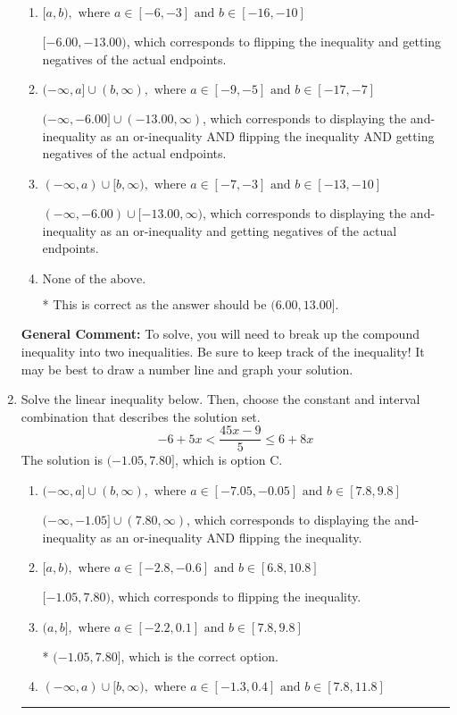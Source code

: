 \documentclass{extbook}[14pt]
\newcommand{\litem}[1]{\item #1

\rule{\textwidth}{0.4pt}}
\begin{document}
\begin{enumerate}
{\begin{enumerate}[label=\Alph*.]
$(-6.00, -13.00]$, which is the correct interval but negatives of the actual endpoints.
\item \( [a, b), \text{ where } a \in [-6, -3] \text{ and } b \in [-16, -10] \)

$[-6.00, -13.00)$, which corresponds to flipping the inequality and getting negatives of the actual endpoints.
\item \( (-\infty, a] \cup (b, \infty), \text{ where } a \in [-9, -5] \text{ and } b \in [-17, -7] \)

$(-\infty, -6.00] \cup (-13.00, \infty)$, which corresponds to displaying the and-inequality as an or-inequality AND flipping the inequality AND getting negatives of the actual endpoints.
\item \( (-\infty, a) \cup [b, \infty), \text{ where } a \in [-7, -3] \text{ and } b \in [-13, -10] \)

$(-\infty, -6.00) \cup [-13.00, \infty)$, which corresponds to displaying the and-inequality as an or-inequality and getting negatives of the actual endpoints.
\item \( \text{None of the above.} \)

* This is correct as the answer should be $(6.00, 13.00]$.
\end{enumerate}

\textbf{General Comment:} To solve, you will need to break up the compound inequality into two inequalities. Be sure to keep track of the inequality! It may be best to draw a number line and graph your solution.
}
\litem{
Solve the linear inequality below. Then, choose the constant and interval combination that describes the solution set.
\[ -6 + 5 x < \frac{45 x - 9}{5} \leq 6 + 8 x \]
The solution is \( (-1.05, 7.80] \), which is option C.\begin{enumerate}[label=\Alph*.]
\item \( (-\infty, a] \cup (b, \infty), \text{ where } a \in [-7.05, -0.05] \text{ and } b \in [7.8, 9.8] \)

$(-\infty, -1.05] \cup (7.80, \infty)$, which corresponds to displaying the and-inequality as an or-inequality AND flipping the inequality.
\item \( [a, b), \text{ where } a \in [-2.8, -0.6] \text{ and } b \in [6.8, 10.8] \)

$[-1.05, 7.80)$, which corresponds to flipping the inequality.
\item \( (a, b], \text{ where } a \in [-2.2, 0.1] \text{ and } b \in [7.8, 9.8] \)

* $(-1.05, 7.80]$, which is the correct option.
\item \( (-\infty, a) \cup [b, \infty), \text{ where } a \in [-1.3, 0.4] \text{ and } b \in [7.8, 11.8] \)


\end{enumerate}}
\end{enumerate}
\end{document}
